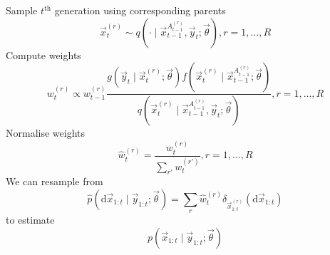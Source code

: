 \begin{algorithmbis}
\begin{algorithmic}[1]
                \State Sample $t^{\text{th}}$ generation using corresponding parents
                    \begin{equation}
                        \vec x_t^{(r)} \sim q\left(\cdot \mid \vec x_{t - 1}^{A_{t - 1}^{(r)}}, \vec y_t; \vec \theta\right), r = 1, \dotsc, R
                    \end{equation}
                \State Compute weights
                    \begin{equation}
                        w_t^{(r)} \propto w_{t - 1}^{(r)} \frac{g\left(\vec y_t \mid \vec x_t^{(r)}; \vec \theta\right) f\left(\vec x_t^{(r)} \mid \vec x_{t - 1}^{A_{t - 1}^{(r)}}; \vec \theta \right)}{q\left(\vec x_t^{(r)} \mid \vec x_{t - 1}^{A_{t - 1}^{(r)}}, \vec y_t; \vec \theta \right)}, r = 1, \dotsc, R
                    \end{equation}
                \State Normalise weights
                    \begin{equation}
                        \hat w_t^{(r)} = \frac{w_t^{(r)}}{\sum_{r'} w_t^{(r')}}, r = 1, \dotsc, R
                    \end{equation}
                \State We can resample from
                    \begin{equation}
                        \hat p(\mathrm d \vec x_{1:t} \mid \vec y_{1:t}; \vec \theta) = \sum_r \hat w_t^{(r)} \delta_{\vec x_{1:t}^{(r)}}(\mathrm d \vec x_{1:t})
                    \end{equation}
                    to estimate
                    \begin{equation}
                        p(\vec x_{1:t} \mid \vec y_{1:t}; \vec \theta)
                    \end{equation}
            \EndFor
        \end{algorithmic}
    \end{algorithmbis}


